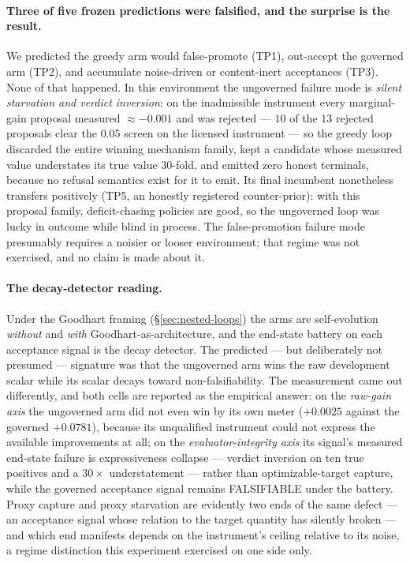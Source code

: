 \paragraph{Three of five frozen predictions were falsified, and the surprise is the
result.} We predicted the greedy arm would false-promote (TP1), out-accept the
governed arm (TP2), and accumulate noise-driven or content-inert acceptances (TP3).
None of that happened. In this environment the ungoverned failure mode is
\emph{silent starvation and verdict inversion}: on the inadmissible instrument every
marginal-gain proposal measured $\approx-0.001$ and was rejected --- $10$ of the $13$
rejected proposals clear the $0.05$ screen on the licensed instrument --- so the
greedy loop discarded the entire winning mechanism family, kept a candidate whose
measured value understates its true value $30$-fold, and emitted zero honest
terminals, because no refusal semantics exist for it to emit. Its final incumbent
nonetheless transfers positively (TP5, an honestly registered counter-prior): with
this proposal family, deficit-chasing policies are good, so the ungoverned loop was
lucky in outcome while blind in process. The false-promotion failure mode presumably
requires a noisier or looser environment; that regime was not exercised, and no claim
is made about it.

\paragraph{The decay-detector reading.} Under the Goodhart framing
(\S\ref{sec:nested-loops}) the arms are self-evolution \emph{without} and \emph{with}
Goodhart-as-architecture, and the end-state battery on each acceptance signal is the
decay detector. The predicted --- but deliberately not presumed --- signature was that
the ungoverned arm wins the raw development scalar while its scalar decays toward
non-falsifiability. The measurement came out differently, and both cells are reported
as the empirical answer: on the \emph{raw-gain axis} the ungoverned arm did not even
win by its own meter ($+0.0025$ against the governed $+0.0781$), because its
unqualified instrument could not express the available improvements at all; on the
\emph{evaluator-integrity axis} its signal's measured end-state failure is
expressiveness collapse --- verdict inversion on ten true positives and a $30\times$
understatement --- rather than optimizable-target capture, while the governed
acceptance signal remains FALSIFIABLE under the battery. Proxy capture and proxy
starvation are evidently two ends of the same defect --- an acceptance signal whose
relation to the target quantity has silently broken --- and which end manifests
depends on the instrument's ceiling relative to its noise, a regime distinction this
experiment exercised on one side only.


